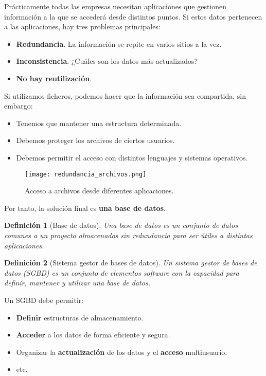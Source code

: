 \documentclass[12pt,spanish]{article}
\newtheorem{definition}{Definición}
\numberwithin{definition}{subsection}
\begin{document}
Prácticamente todas las empresas necesitan aplicaciones que gestionen información a la que se accederá desde distintos puntos. Si estos datos pertenecen a las aplicaciones, hay tres problemas principales:
\begin{itemize}
	\item \textbf{Redundancia}. La información se repite en varios sitios a la vez.
	\item \textbf{Inconsistencia}. ¿Cuáles son los datos más actualizados?
	\item \textbf{No hay reutilización}. 
\end{itemize}

Si utilizamos ficheros, podemos hacer que la información sea compartida, sin embargo:
\begin{itemize}
	\item Tenemos que mantener una estructura determinada.
	\item Debemos proteger los archivos de ciertos usuarios.
	\item Debemos permitir el acceso con distintos lenguajes y sistemas operativos.
\end{itemize}

\begin{figure}[H]
\centering
\texttt{[image: redundancia\_archivos.png]}
\caption{Acceso a archivos desde diferentes aplicaciones.}
\end{figure}

Por tanto, la solución final es \textbf{una base de datos}.

\begin{definition}[Base de datos]
Una \emph{base de datos} es un conjunto de datos comunes a un \textit{proyecto} almacenados sin redundancia para ser útiles a distintas aplicaciones.
\end{definition}

\begin{definition}[Sistema gestor de bases de datos]
Un \emph{sistema gestor de bases de datos (SGBD)} es un conjunto de elementos software con la capacidad para definir, mantener y utilizar una base de datos.
\end{definition}

Un SGBD debe permitir:
\begin{itemize}
\item \textbf{Definir} estructuras de almacenamiento.
\item \textbf{Acceder} a los datos de forma eficiente y segura.
\item Organizar la \textbf{actualización} de los datos y el \textbf{acceso} multiusuario.
\item etc.
\end{itemize}
\end{document}

